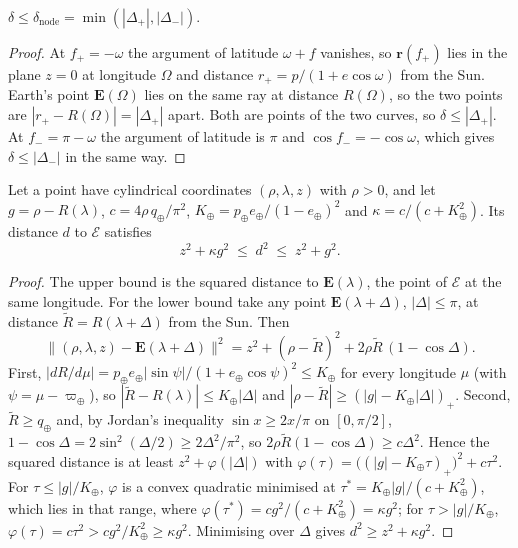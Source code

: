 \documentclass[make,article,submit,moreauthors]{Definitions/mdpi}
\begin{document}
\begin{Lemma}\label{lem:node}
$\delta \le \delta_{\mathrm{node}} = \min(|\Delta_+|, |\Delta_-|)$.
\end{Lemma}
\begin{proof}
At $f_+ = -\omega$ the argument of latitude $\omega + f$ vanishes, so $\mathbf{r}(f_+)$ lies in the plane $z = 0$ at longitude $\Omega$ and distance $r_+ = p/(1 + e\cos\omega)$ from the Sun. Earth's point $\mathbf{E}(\Omega)$ lies on the same ray at distance $R(\Omega)$, so the two points are $|r_+ - R(\Omega)| = |\Delta_+|$ apart. Both are points of the two curves, so $\delta \le |\Delta_+|$. At $f_- = \pi - \omega$ the argument of latitude is $\pi$ and $\cos f_- = -\cos\omega$, which gives $\delta \le |\Delta_-|$ in the same way.
\end{proof}

\begin{Lemma}\label{lem:bracket}
Let a point have cylindrical coordinates $(\rho, \lambda, z)$ with $\rho > 0$, and let $g = \rho - R(\lambda)$, $c = 4\rho\,q_\oplus/\pi^2$, $K_\oplus = p_\oplus e_\oplus/(1 - e_\oplus)^2$ and $\kappa = c/(c + K_\oplus^2)$. Its distance $d$ to $\mathcal{E}$ satisfies
\[
z^2 + \kappa g^2 \;\le\; d^2 \;\le\; z^2 + g^2 .
\]
\end{Lemma}
\begin{proof}
The upper bound is the squared distance to $\mathbf{E}(\lambda)$, the point of $\mathcal{E}$ at the same longitude. For the lower bound take any point $\mathbf{E}(\lambda + \Delta)$, $|\Delta| \le \pi$, at distance $\tilde R = R(\lambda + \Delta)$ from the Sun. Then
\[
\lVert(\rho,\lambda,z) - \mathbf{E}(\lambda+\Delta)\rVert^2 = z^2 + (\rho - \tilde R)^2 + 2\rho\tilde R\,(1 - \cos\Delta).
\]
First, $|dR/d\mu| = p_\oplus e_\oplus|\sin\psi|/(1 + e_\oplus\cos\psi)^2 \le K_\oplus$ for every longitude $\mu$ (with $\psi = \mu - \varpi_\oplus$), so $|\tilde R - R(\lambda)| \le K_\oplus|\Delta|$ and $|\rho - \tilde R| \ge (|g| - K_\oplus|\Delta|)_+$. Second, $\tilde R \ge q_\oplus$ and, by Jordan's inequality $\sin x \ge 2x/\pi$ on $[0, \pi/2]$, $1 - \cos\Delta = 2\sin^2(\Delta/2) \ge 2\Delta^2/\pi^2$, so $2\rho\tilde R(1 - \cos\Delta) \ge c\Delta^2$. Hence the squared distance is at least $z^2 + \varphi(|\Delta|)$ with $\varphi(\tau) = \bigl((|g| - K_\oplus\tau)_+\bigr)^2 + c\tau^2$. For $\tau \le |g|/K_\oplus$, $\varphi$ is a convex quadratic minimised at $\tau^* = K_\oplus|g|/(c + K_\oplus^2)$, which lies in that range, where $\varphi(\tau^*) = c g^2/(c + K_\oplus^2) = \kappa g^2$; for $\tau > |g|/K_\oplus$, $\varphi(\tau) = c\tau^2 > c g^2/K_\oplus^2 \ge \kappa g^2$. Minimising over $\Delta$ gives $d^2 \ge z^2 + \kappa g^2$.
\end{proof}
\end{document}
